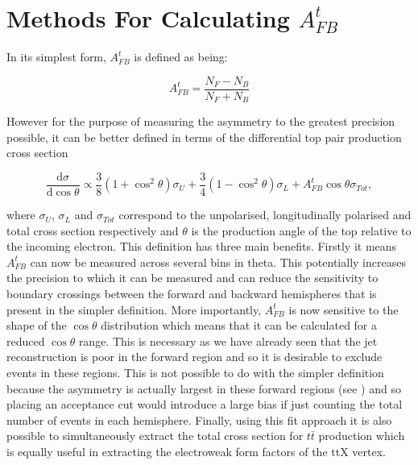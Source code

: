 \section{Methods For Calculating $A_{FB}^t$}
\label{Calculating AFB}

In its simplest form, $A_{FB}^t$ is defined as being:

\begin{equation}
A_{FB}^t=\frac{N_F-N_B}{N_F+N_B}
\end{equation}

However for the purpose of measuring the asymmetry to the greatest precision possible, it can be better defined in terms of the differential top pair production cross section\cite{PhysRevD.25.1218}

\begin{equation}
  \label{eq:afbfit}
\frac{\mathrm{d}\sigma}{\mathrm{d}\cos\theta} \propto \frac{3}{8}(1+\cos^{2}\theta)\sigma_{U} + \frac{3}{4}(1-\cos^{2}\theta)\sigma_{L} + A_{FB}^{t}\cos\theta\sigma_{Tot},
\end{equation}

where $\sigma_U$, $\sigma_L$ and $\sigma_{Tot}$ correspond to the unpolarised, longitudinally polarised and total cross section respectively and $\theta$ is the production angle of the top relative to the incoming electron. This definition has three main benefits. Firstly it means $A_{FB}^t$ can now be measured across several bins in theta. This potentially increases the precision to which it can be measured and can reduce the sensitivity to boundary crossings between the forward and backward hemispheres that is present in the simpler definition. More importantly, $A_{FB}^t$ is now sensitive to the shape of the $\cos\theta$ distribution which means that it can be calculated for a reduced $\cos\theta$ range. This is necessary as we have already seen that the jet reconstruction is poor in the forward region and so it is desirable to exclude events in these regions. This is not possible to do with the simpler definition because the asymmetry is actually largest in these forward regions (see ) and so placing an acceptance cut would introduce a large bias if just counting the total number of events in each hemisphere. Finally, using this fit approach it is also possible to simultaneously extract the total cross section for $t\bar{t}$ production which is equally useful in extracting the electroweak form factors of the ttX vertex.

